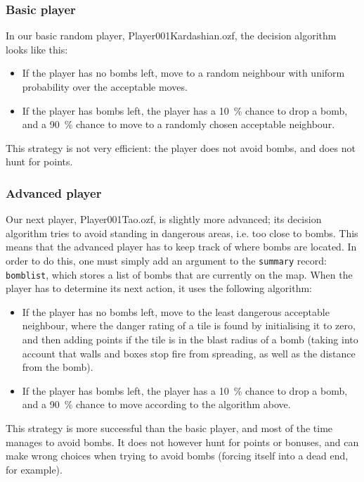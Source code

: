 \documentclass[12pt,journal]{IEEEtran}
\newcommand{\ntt}{\normalfont\ttfamily}
\newcommand{\fn}[1]{{\protect\ntt#1}}
\begin{document}
\subsubsection{Basic player}
In our basic random player, \fn{Player001Kardashian.ozf}, the decision algorithm looks like this:
\begin{itemize}
	\item If the player has no bombs left, move to a random neighbour with uniform probability over the acceptable moves.
	\item If the player has bombs left, the player has a \SI{10}{\percent} chance to drop a bomb, and a \SI{90}{\percent} chance to move to a randomly chosen acceptable neighbour.
\end{itemize}

This strategy is not very efficient: the player does not avoid bombs, and does not hunt for points.

\subsubsection{Advanced player}
Our next player, \fn{Player001Tao.ozf}, is slightly more advanced; its decision algorithm tries to avoid standing in dangerous areas, i.e. too close to bombs.
This means that the advanced player has to keep track of where bombs are located.
In order to do this, one must simply add an argument to the \lstinline|summary| record: \lstinline|bomblist|, which stores a list of bombs that are currently on the map.
When the player has to determine its next action, it uses the following algorithm:
\begin{itemize}
	\item If the player has no bombs left, move to the least dangerous acceptable neighbour, where the danger rating of a tile is found by initialising it to zero, and then adding points if the tile is in the blast radius of a bomb (taking into account that walls and boxes stop fire from spreading, as well as the distance from the bomb).
	\item If the player has bombs left, the player has a \SI{10}{\percent} chance to drop a bomb, and a \SI{90}{\percent} chance to move according to the algorithm above.
\end{itemize}

This strategy is more successful than the basic player, and most of the time manages to avoid bombs.
It does not however hunt for points or bonuses, and can make wrong choices when trying to avoid bombs (forcing itself into a dead end, for example).
\end{document}
